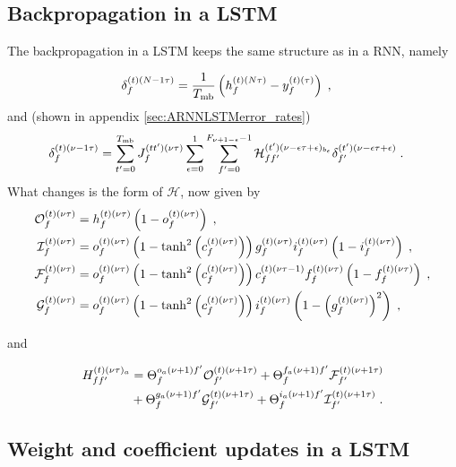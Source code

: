 \subsection{Backpropagation in a LSTM} \label{sec:appendbackproplstm}


The backpropagation in a LSTM keeps the same structure as in a RNN, namely

\begin{align}
\delta^{(t)(N-1\tau)}_f&= \frac{1}{T_{{\rm mb}}}\left(h_{f}^{(t)(N\tau)}-y_f^{(t)(\tau)}\right)\;,
\end{align}
and (shown in appendix \ref{sec:ARNNLSTMerror_rates})
\begin{align}
\delta^{(t)(\nu-1\tau)}_f&=
%
\sum_{t'=0}^{T_{{\rm mb}}}J^{(tt')(\nu\tau)}_f\sum_{\epsilon=0}^{1}\sum_{f'=0}^{F_{\nu+1-\epsilon}-1}
%
\mathcal{H}^{(t')(\nu-\epsilon\tau+\epsilon)_{b_\epsilon}}_{ff'}\delta^{(t')(\nu-\epsilon\tau+\epsilon)}_{f'}\;.
\end{align}
What changes is the form of $\mathcal{H}$, now given by
\begin{align}
\mathcal{O}^{(t)(\nu\tau)}_{f}&=h^{(t)(\nu\tau)}_{f}
%
\left(1-o^{(t)(\nu\tau)}_{f}\right)\;,\notag\\
%
\mathcal{I}^{(t)(\nu\tau)}_{f}&=o^{(t)(\nu\tau)}_{f}\left(1-\tanh^2\left(c^{(t)(\nu\tau)}_{f}\right)
%
\right)g^{(t)(\nu\tau)}_{f} i^{(t)(\nu\tau)}_{f}\left(1-i^{(t)(\nu\tau)}_{f}\right)\;,\notag\\
%
\mathcal{F}^{(t)(\nu\tau)}_{f}&=o^{(t)(\nu\tau)}_{f}\left(1-\tanh^2\left(c^{(t)(\nu\tau)}_{f}\right)
%
\right)c^{(t)(\nu\tau-1)}_{f} f^{(t)(\nu\tau)}_{f}\left(1-f^{(t)(\nu\tau)}_{f}\right)\;,\notag\\
%
\mathcal{G}^{(t)(\nu\tau)}_{f}&=o^{(t)(\nu\tau)}_{f}\left(1-\tanh^2\left(c^{(t)(\nu\tau)}_{f}\right)
%
\right)i^{(t)(\nu\tau)}_{f}\left(1-\left(g^{(t)(\nu\tau)}_{f}\right)^2\right)\;,
\end{align}

and

\begin{align}
H^{(t)(\nu\tau)_a}_{ff'}&=\Theta^{o_a(\nu+1)f'}_{f}\mathcal{O}^{(t)(\nu+1\tau)}_{f'}
%
+\Theta^{f_a(\nu+1)f'}_{f}\mathcal{F}^{(t)(\nu+1\tau)}_{f'}\notag\\
%
&+\Theta^{g_a(\nu+1)f'}_{f}\mathcal{G}^{(t)(\nu+1\tau)}_{f'}
%
+\Theta^{i_a(\nu+1)f'}_{f}\mathcal{I}^{(t)(\nu+1\tau)}_{f'}\;.
\end{align}


\subsection{Weight and coefficient updates in a LSTM}

